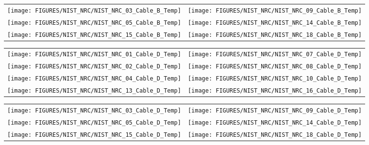 \begin{figure}[p]
\begin{tabular*}{\textwidth}{l@{\extracolsep{\fill}}r}
\texttt{[image: FIGURES/NIST\_NRC/NIST\_NRC\_03\_Cable\_B\_Temp]} &
\texttt{[image: FIGURES/NIST\_NRC/NIST\_NRC\_09\_Cable\_B\_Temp]} \\
\texttt{[image: FIGURES/NIST\_NRC/NIST\_NRC\_05\_Cable\_B\_Temp]} &
\texttt{[image: FIGURES/NIST\_NRC/NIST\_NRC\_14\_Cable\_B\_Temp]} \\
\texttt{[image: FIGURES/NIST\_NRC/NIST\_NRC\_15\_Cable\_B\_Temp]} &
\texttt{[image: FIGURES/NIST\_NRC/NIST\_NRC\_18\_Cable\_B\_Temp]}
\end{tabular*}
\label{NIST_NRC_Cable_B_Open}
\end{figure}

\begin{figure}[p]
\begin{tabular*}{\textwidth}{l@{\extracolsep{\fill}}r}
\texttt{[image: FIGURES/NIST\_NRC/NIST\_NRC\_01\_Cable\_D\_Temp]} &
\texttt{[image: FIGURES/NIST\_NRC/NIST\_NRC\_07\_Cable\_D\_Temp]} \\
\texttt{[image: FIGURES/NIST\_NRC/NIST\_NRC\_02\_Cable\_D\_Temp]} &
\texttt{[image: FIGURES/NIST\_NRC/NIST\_NRC\_08\_Cable\_D\_Temp]} \\
\texttt{[image: FIGURES/NIST\_NRC/NIST\_NRC\_04\_Cable\_D\_Temp]} &
\texttt{[image: FIGURES/NIST\_NRC/NIST\_NRC\_10\_Cable\_D\_Temp]} \\
\texttt{[image: FIGURES/NIST\_NRC/NIST\_NRC\_13\_Cable\_D\_Temp]} &
\texttt{[image: FIGURES/NIST\_NRC/NIST\_NRC\_16\_Cable\_D\_Temp]}
\end{tabular*}
\label{NIST_NRC_Cable_D_Closed}
\end{figure}

\begin{figure}[p]
\begin{tabular*}{\textwidth}{l@{\extracolsep{\fill}}r}
\texttt{[image: FIGURES/NIST\_NRC/NIST\_NRC\_03\_Cable\_D\_Temp]} &
\texttt{[image: FIGURES/NIST\_NRC/NIST\_NRC\_09\_Cable\_D\_Temp]} \\
\texttt{[image: FIGURES/NIST\_NRC/NIST\_NRC\_05\_Cable\_D\_Temp]} &
\texttt{[image: FIGURES/NIST\_NRC/NIST\_NRC\_14\_Cable\_D\_Temp]} \\
\texttt{[image: FIGURES/NIST\_NRC/NIST\_NRC\_15\_Cable\_D\_Temp]} &
\texttt{[image: FIGURES/NIST\_NRC/NIST\_NRC\_18\_Cable\_D\_Temp]}
\end{tabular*}
\label{NIST_NRC_Cable_D_Open}
\end{figure}

